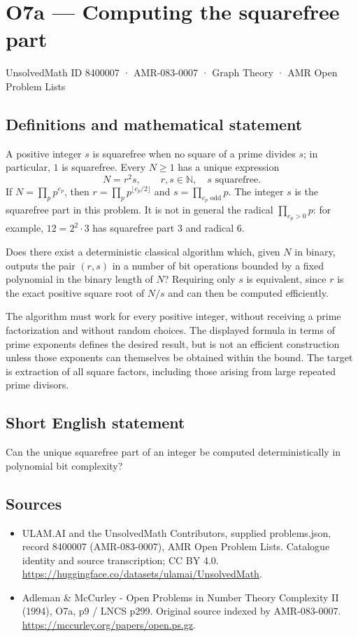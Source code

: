 \documentclass[11pt,a4paper]{article}
\begin{document}
\section*{O7a — Computing the squarefree part}\label{8400007}
{\small UnsolvedMath ID 8400007 · AMR-083-0007 · Graph Theory · AMR Open Problem Lists}
\subsection{Definitions and mathematical statement}
A positive integer $s$ is squarefree when no square of a prime divides $s$; in particular, $1$ is squarefree. Every $N\ge1$ has a unique expression
\[
N=r^2s,\qquad r,s\in\mathbb N,\quad s\text{ squarefree}.
\]
If $N=\prod_p p^{e_p}$, then $r=\prod_p p^{\lfloor e_p/2\rfloor}$ and $s=\prod_{e_p\text{ odd}}p$. The integer $s$ is the squarefree part in this problem. It is not in general the radical $\prod_{e_p>0}p$: for example, $12=2^2\cdot3$ has squarefree part $3$ and radical $6$.

Does there exist a deterministic classical algorithm which, given $N$ in binary, outputs the pair $(r,s)$ in a number of bit operations bounded by a fixed polynomial in the binary length of $N$? Requiring only $s$ is equivalent, since $r$ is the exact positive square root of $N/s$ and can then be computed efficiently.

The algorithm must work for every positive integer, without receiving a prime factorization and without random choices. The displayed formula in terms of prime exponents defines the desired result, but is not an efficient construction unless those exponents can themselves be obtained within the bound. The target is extraction of all square factors, including those arising from large repeated prime divisors.
\subsection{Short English statement}
Can the unique squarefree part of an integer be computed deterministically in polynomial bit complexity?
\subsection{Sources}
\begin{itemize}
\item[S1] ULAM.AI and the UnsolvedMath Contributors, supplied problems.json, record 8400007 (AMR-083-0007), AMR Open Problem Lists. Catalogue identity and source transcription; CC BY 4.0.
\url{https://huggingface.co/datasets/ulamai/UnsolvedMath}.
\item[S2] Adleman \& McCurley - Open Problems in Number Theory Complexity II (1994), O7a, p9 / LNCS p299. Original source indexed by AMR-083-0007.
\url{https://mccurley.org/papers/open.ps.gz}.
\end{itemize}
\end{document}

